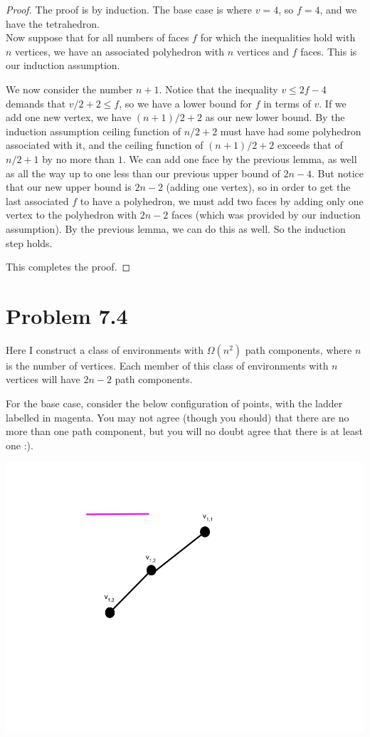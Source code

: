\documentclass[12pt]{article}
\theoremstyle{definition}
\begin{document}
\begin{proof}
The proof is by induction. The base case is where $v = 4$, so $f = 4$, and we have the tetrahedron. \\

Now suppose that for all numbers of faces $f$ for which the inequalities hold with $n$ vertices, we have an associated polyhedron with $n$ vertices and $f$ faces. This is our induction assumption.

We now consider the number $n+1$. Notice that the inequality $v \le 2f - 4$ demands that $v/2 + 2 \le f$, so we have a lower bound for $f$ in terms of $v$. If we add one new vertex, we have $ (n + 1)/2 + 2 $ as our new lower bound. By the induction assumption ceiling function of $n/2 + 2$ must have had some polyhedron associated with it, and the ceiling function of $(n+1)/2 + 2$ exceeds that of $n/2 + 1$ by no more than $1$. We can add one face by the previous lemma, as well as all the way up to one less than our previous upper bound of $2n -4$. But notice that our new upper bound is $2n - 2$ (adding one vertex), so in order to get the last associated $f$ to have a polyhedron, we must add two faces by adding only one vertex to the polyhedron with $2n - 2$ faces (which was provided by our induction assumption). By the previous lemma, we can do this as well. So the induction step holds.

This completes the proof. 
\end{proof}

\section{Problem 7.4}

Here I construct a class of environments with $\Omega(n^2)$ path components, where $n$ is the number of vertices. Each member of this class of environments with $n$ vertices will have $2n-2$ path components.

For the base case, consider the below configuration of points, with the ladder labelled in magenta. You may not agree (though you should) that there are no more than one path component, but you will no doubt agree that there is at least one :).

\includegraphics[scale=0.5]{Base Case.jpg} 
\end{document}

